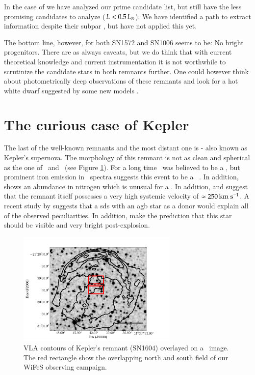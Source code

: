 In the case of  we have analyzed our prime candidate list, but still have the less promising candidates to analyze ($L<0.5\,\hbox{$L_{\odot}$}$). We have identified a path to extract information despite their subpar \snratio, but have not applied this yet.

The bottom line, however, for both SN1572 and SN1006 seems to be: No bright progenitors. There are as always caveats, but we do think that with current theoretical knowledge and current instrumentation it is not worthwhile to scrutinize the candidate stars in both remnants further. One could however think about photometrically deep observations of these remnants and look for a hot white dwarf suggested by some new models \citep{2010A&A...514A..53F}. 

\section{The curious case of Kepler}

The last of the well-known remnants and the most distant one \citep[][estimates a distance of $\ge 6$\,\kpc]{2008ApJ...689..231V} is  - also known as Kepler's supernova.  The morphology of this remnant is not as clean and spherical as the one of \ and \ (see Figure \ref{fig:sn1604_observations}). For a long time \ was believed to be a \snib, but prominent iron emission in \xray\ spectra \citep{2007ApJ...668L.135R} suggests this event to be a \snia\ \citep{1995ApJ...444L..81H}. In addition,  shows an abundance in nitrogen which is unusual for a \snia. In addition, \citet{1991ApJ...366..484B} and \citet{2003A&A...407..249S} suggest that the remnant itself possesses a very high systemic velocity of  $\approx 250\,\textrm{km}~\textrm{s}^{-1}$. A recent study by \citet{2011arXiv1103.5487C} suggests that a \gls{sds} with an \gls{agb} star as a \gls{donor} would explain all of the observed peculiarities. In addition, \citet{2011arXiv1103.5487C} make the prediction that this star should be visible and very bright post-explosion. 

\begin{figure}[tb] %
   \centering
   \includegraphics[width=0.7\textwidth]{chapter_conclusion/plots/sn1604_overlay.pdf} 
   \caption[VLA contours of Kepler's remnant (SN1604) overlayed on a 2MASS image]{VLA contours of Kepler's remnant (SN1604) overlayed on a \twomass\ image. The red rectangle show the overlapping north and south field of our WiFeS observing campaign.}
   \label{fig:sn1604_observations}
\end{figure}


